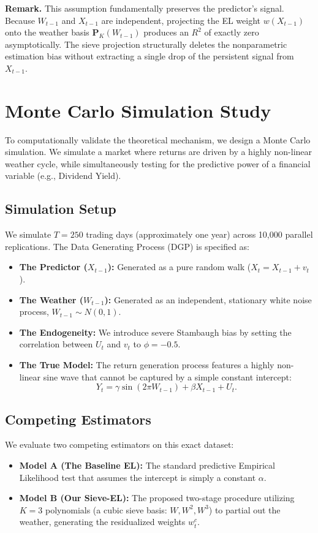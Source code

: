 \documentclass{article}
\begin{document}
\noindent \textbf{Remark.} This assumption fundamentally preserves the predictor's signal. Because $W_{t-1}$ and $X_{t-1}$ are independent, projecting the EL weight $w(X_{t-1})$ onto the weather basis $\bm{P}_K(W_{t-1})$ produces an $R^2$ of exactly zero asymptotically. The sieve projection structurally deletes the nonparametric estimation bias without extracting a single drop of the persistent signal from $X_{t-1}$.

\section{Monte Carlo Simulation Study}

To computationally validate the theoretical mechanism, we design a Monte Carlo simulation. We simulate a market where returns are driven by a highly non-linear weather cycle, while simultaneously testing for the predictive power of a financial variable (e.g., Dividend Yield).

\subsection{Simulation Setup}
We simulate $T = 250$ trading days (approximately one year) across 10,000 parallel replications. The Data Generating Process (DGP) is specified as:
\begin{itemize}
    \item \textbf{The Predictor ($X_{t-1}$):} Generated as a pure random walk ($X_t = X_{t-1} + v_t$).
    \item \textbf{The Weather ($W_{t-1}$):} Generated as an independent, stationary white noise process, $W_{t-1} \sim N(0,1)$.
    \item \textbf{The Endogeneity:} We introduce severe Stambaugh bias by setting the correlation between $U_t$ and $v_t$ to $\phi = -0.5$.
    \item \textbf{The True Model:} The return generation process features a highly non-linear sine wave that cannot be captured by a simple constant intercept:
    \begin{equation}
        Y_t = \gamma \sin(2\pi W_{t-1}) + \beta X_{t-1} + U_t.
    \end{equation}
\end{itemize}

\subsection{Competing Estimators}
We evaluate two competing estimators on this exact dataset:
\begin{itemize}
    \item \textbf{Model A (The Baseline EL):} The standard predictive Empirical Likelihood test that assumes the intercept is simply a constant $\alpha$.
    \item \textbf{Model B (Our Sieve-EL):} The proposed two-stage procedure utilizing $K=3$ polynomials (a cubic sieve basis: $W, W^2, W^3$) to partial out the weather, generating the residualized weights $w^c_t$.
\end{itemize}
\end{document}
